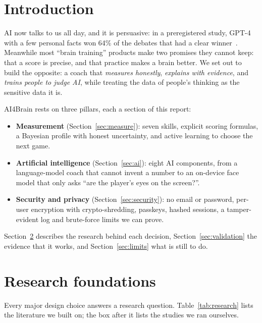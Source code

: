 \documentclass[11pt,a4paper]{article}
\newcommand{\aitag}[2]{{\color{#1}\textbf{#2}}}
\begin{document}
\setcounter{tocdepth}{2}
\tableofcontents
\newpage

\section{Introduction}

AI now talks to us all day, and it is persuasive: in a preregistered study, GPT-4 with a few personal facts won 64\% of the debates that had a clear winner~\cite{salvi}. Meanwhile most ``brain training'' products make two promises they cannot keep: that a score is precise, and that practice makes a brain better. We set out to build the opposite: a coach that \emph{measures honestly}, \emph{explains with evidence}, and \emph{trains people to judge AI}, while treating the data of people's thinking as the sensitive data it is.

AI4Brain rests on three pillars, each a section of this report:
\begin{itemize}
\item \aitag{prob}{Measurement} (Section~\ref{sec:measure}): seven skills, explicit scoring formulas, a Bayesian profile with honest uncertainty, and active learning to choose the next game.
\item \aitag{gen}{Artificial intelligence} (Section~\ref{sec:ai}): eight AI components, from a language-model coach that cannot invent a number to an on-device face model that only asks ``are the player's eyes on the screen?''.
\item \aitag{guard}{Security and privacy} (Section~\ref{sec:security}): no email or password, per-user encryption with crypto-shredding, passkeys, hashed sessions, a tamper-evident log and brute-force limits we can prove.
\end{itemize}
Section~\ref{sec:research} describes the research behind each decision, Section~\ref{sec:validation} the evidence that it works, and Section~\ref{sec:limits} what is still to do.

\section{Research foundations}
\label{sec:research}

Every major design choice answers a research question. Table~\ref{tab:research} lists the literature we built on; the box after it lists the studies we ran ourselves.
\end{document}
